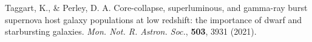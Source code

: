 \documentclass{nature_plusfigure}
\newcommand{\mn}{{Mon. Not. R. Astron. Soc.}}
\newcommand{\mnras}{\mn}
\newcommand{\apj}{{Astrophys. J.}}
\newcommand{\aap}{{Astron. Astrophys.}}
\begin{document}
\begin{methods}
\begin{thebibliography}{10}
 Taggart, K., \& Perley, D. A. Core-collapse, superluminous, and gamma-ray burst supernova host galaxy populations at low redshift: the importance of dwarf and starbursting galaxies. \emph{\mnras}, \textbf{503}, 3931 (2021). 


%
%
%

\end{thebibliography}

\end{methods}

\clearpage
\end{document}
